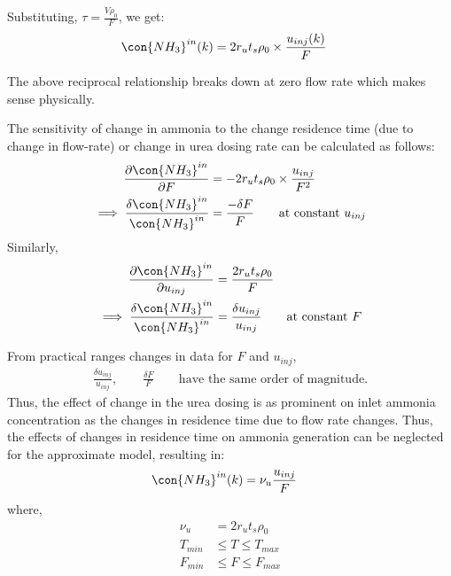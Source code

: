 Substituting, $\tau = \frac{V \rho_0}{F}$, we get:
\begin{align}
    \con{NH_3}^{in} (k) &= 2r_u t_s \rho_0 \times \frac{u_{inj}(k)}{F}
\end{align}

The above reciprocal relationship breaks down at zero flow rate which makes sense physically.

The sensitivity of change in ammonia to the change residence time (due to change in flow-rate) or change in urea dosing rate can be calculated as follows:
\begin{align*}
    \frac{\partial \con{NH_3}^{in} }{\partial F} &= -2 r_u t_s \rho_0 \times \frac{u_{inj}}{F^2} \\
    \implies \frac{\delta \con{NH_3}^{in}}{\con{NH_3}^{in}} &= \frac{-\delta F}{F}
    \qquad \text{at constant } u_{inj}
\end{align*}
Similarly,
\begin{align*}
    \frac{\partial \con{NH_3}^{in} }{\partial u_{inj}} &= \frac{2 r_u t_s \rho_0}{F} \\
    \implies \frac{\delta \con{NH_3}^{in}}{\con{NH_3}^{in}} &= \frac{ \delta u_{inj}}{u_{inj}} \qquad \text{at constant } F
\end{align*}

From practical ranges changes in data for $F$ and $u_{inj}$,
\begin{align*}
    \frac{ \delta u_{inj}}{u_{inj}}, \qquad \frac{\delta F}{F} \qquad \text{have the same order of magnitude.}
\end{align*}
Thus, the effect of change in the urea dosing is as prominent on inlet ammonia concentration as the changes in residence time due to flow rate changes. Thus, the effects of changes in residence time on ammonia generation can be neglected for the approximate model, resulting in:
\begin{align}
    \con{NH_3}^{in}(k) &= \nu_u \frac{u_{inj}}{F}    \label{eqn::urea_inj}
\end{align}
where,
\begin{align*}
    \nu_u &= 2 r_u t_s \rho_0\\
    T_{min} &\leq T \leq T_{max}\\
    F_{min} &\leq F \leq F_{max}
\end{align*}
